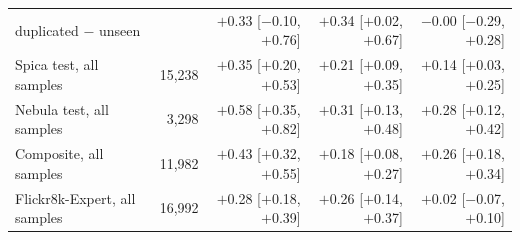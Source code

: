 \begin{tabular}{lrrrr}
\quad duplicated $-$ unseen & & $+$0.33 [$-$0.10, $+$0.76] & $+$0.34 [$+$0.02, $+$0.67] & $-$0.00 [$-$0.29, $+$0.28] \\
Spica test, all samples & 15,238 & $+$0.35 [$+$0.20, $+$0.53] & $+$0.21 [$+$0.09, $+$0.35] & $+$0.14 [$+$0.03, $+$0.25] \\
Nebula test, all samples & 3,298 & $+$0.58 [$+$0.35, $+$0.82] & $+$0.31 [$+$0.13, $+$0.48] & $+$0.28 [$+$0.12, $+$0.42] \\
Composite, all samples & 11,982 & $+$0.43 [$+$0.32, $+$0.55] & $+$0.18 [$+$0.08, $+$0.27] & $+$0.26 [$+$0.18, $+$0.34] \\
Flickr8k-Expert, all samples & 16,992 & $+$0.28 [$+$0.18, $+$0.39] & $+$0.26 [$+$0.14, $+$0.37] & $+$0.02 [$-$0.07, $+$0.10] \\
\bottomrule
\end{tabular}

